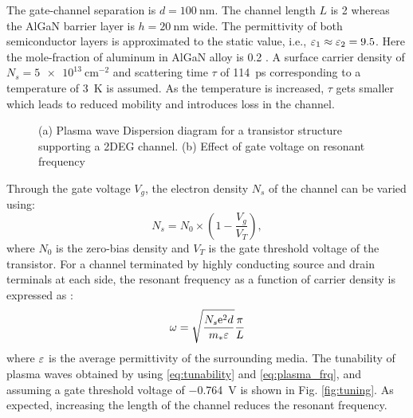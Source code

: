 The gate-channel separation is $d = \SI{100}{\nm}$. The channel length $L$ is \SI{2}{\micm} whereas the AlGaN barrier layer is $h = \SI{20}{\nm}$ wide.
The permittivity of both semiconductor layers is approximated to the static value, i.e., $\varepsilon_1 \approx \varepsilon_2 = 9.5$. Here the mole-fraction of aluminum in AlGaN alloy is \SI{.2}{} \cite{Muravjov2010}. A surface carrier density of $N_s=\SI{5e13}{\cm^{-2}}$ and scattering time $\tau$ of \SI{114}{\ps} corresponding to a temperature of \SI{3}{\kelvin} is assumed. As the temperature is increased, $\tau$ gets smaller which leads to reduced mobility and introduces loss in the channel.
%
\begin{figure}[t!]
      \hfil
  \caption{(a) Plasma wave Dispersion diagram for a transistor structure supporting a 2DEG channel. (b) Effect of gate voltage on resonant frequency}
  \label{fig:matlab_simulation}
\end{figure}
%
Through the gate voltage $V_g$, the electron density $N_s$ of the channel can be varied using:
%
\begin{equation}
  N_s = N_0 \times \left(1 - \frac{V_g}{V_T} \right),
  \label{eq:tunability}
\end{equation}
%
where $N_0$ is the zero-bias density and $V_T$ is the gate threshold voltage of the transistor. For a channel terminated by highly conducting source and drain terminals at each side, the resonant frequency as a function of carrier density is expressed as \cite{Popov2008}:
%
\begin{equation}
  \omega = \sqrt{\frac{N_s \mathrm{e}^2 d}{m_{\ast} \varepsilon}} \frac{\pi}{L}
  \label{eq:plasma_frq}
\end{equation}
%
where $\varepsilon$ is the average permittivity of the surrounding media. The tunability of plasma waves obtained by using \eqref{eq:tunability} and \eqref{eq:plasma_frq}, and assuming a gate threshold voltage of \SI{-.764}{\volt} is shown in Fig. \ref{fig:tuning}. As expected, increasing the length of the channel reduces the resonant frequency.
%
%
%
